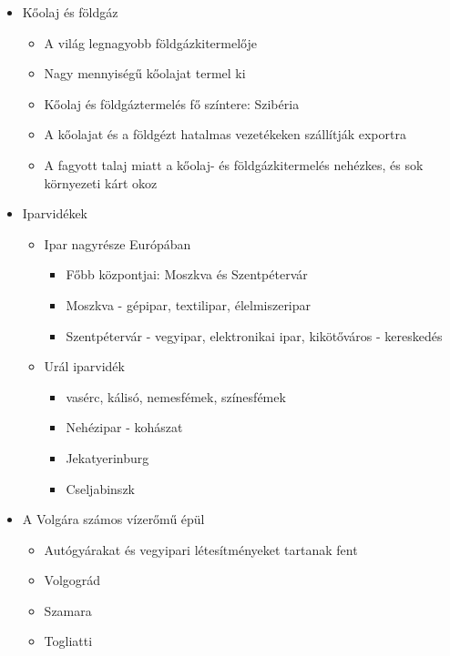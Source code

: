 \documentclass{article}
\begin{document}
\begin{itemize}
    \item Kőolaj és földgáz 
    \begin{itemize}
        \item A világ legnagyobb földgázkitermelője
        \item Nagy mennyiségű kőolajat termel ki
        \item Kőolaj és földgáztermelés fő színtere: Szibéria
        \item A kőolajat és a földgézt hatalmas vezetékeken szállítják exportra
        \item A fagyott talaj miatt a kőolaj- és földgázkitermelés nehézkes, és sok környezeti kárt okoz
        \end{itemize}
    \item Iparvidékek 
    \begin{itemize}
        \item Ipar nagyrésze Európában 
        \begin{itemize}
            \item Főbb központjai: Moszkva és Szentpétervár
            \item Moszkva - gépipar, textilipar, élelmiszeripar
            \item Szentpétervár - vegyipar, elektronikai ipar, kikötőváros - kereskedés 
        \end{itemize}
        \item Urál iparvidék 
        \begin{itemize}
            \item vasérc, kálisó, nemesfémek, színesfémek 
            \item Nehézipar - kohászat
            \item Jekatyerinburg 
            \item Cseljabinszk
        \end{itemize}
    \end{itemize}
    \item A Volgára számos vízerőmű épül 
    \begin{itemize}
        \item Autógyárakat és vegyipari létesítményeket tartanak fent   
        \item Volgográd
        \item Szamara
        \item Togliatti
    \end{itemize}
\end{itemize}
\end{document}
